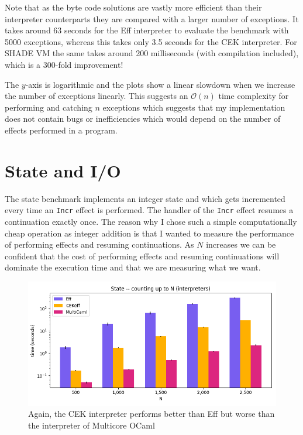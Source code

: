 \documentclass[class=article, crop=false]{standalone}
\begin{document}
Note that as the byte code solutions are vastly more efficient than their
interpreter counterparts they are compared with a larger number of exceptions.
It takes around 63 seconds for the Eff interpreter to evaluate the benchmark
with 5000 exceptions, whereas this takes only 3.5 seconds for the CEK
interpreter. For SHADE VM the same takes around 200 milliseconds
(with compilation included), which is a 300-fold improvement!

The $y$-axis is logarithmic and the plots show a linear slowdown when we
increase the number of exceptions linearly. This suggests an $\mathcal{O}(n)$
time complexity for performing and catching $n$ exceptions which suggests that
my implementation does not contain bugs or inefficiencies which would depend
on the number of effects performed in a program.

\section{State and I/O}

The state benchmark implements an integer state and which gets incremented every
time an \verb|Incr| effect is performed. The handler of the \verb|Incr| effect
resumes a continuation exactly once. The reason why I chose such a simple
computationally cheap operation as integer addition is that I wanted to measure
the performance of performing effects and resuming continuations. As $N$
increases we can be confident that the cost of performing effects and resuming
continuations will dominate the execution time and that we are measuring what
we want.

\begin{figure}
    \centering
    \includegraphics[width=35em]{eval_plots/interp_state.png}
    \caption{Again, the CEK interpreter performs better than Eff but worse than
    the interpreter of Multicore OCaml}
    \label{fig:state-interpreters}
\end{figure}
\end{document}
